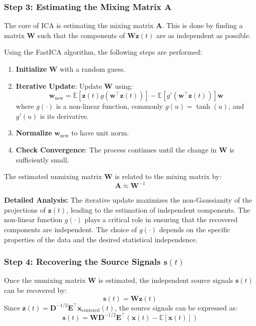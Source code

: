\documentclass{exam}
\begin{document}
\subsubsection{Step 3: Estimating the Mixing Matrix \(\mathbf{A}\)}

The core of ICA is estimating the mixing matrix \( \mathbf{A} \). This is done by finding a matrix \( \mathbf{W} \) such that the components of \( \mathbf{W} \mathbf{z}(t) \) are as independent as possible.

Using the FastICA algorithm, the following steps are performed:

\begin{enumerate}
    \item \textbf{Initialize} \( \mathbf{W} \) with a random guess.
    \item \textbf{Iterative Update}: Update \( \mathbf{W} \) using:
    \[
    \mathbf{w}_{\text{new}} = \mathbb{E}[\mathbf{z}(t) g(\mathbf{w}^\top \mathbf{z}(t))] - \mathbb{E}[g'(\mathbf{w}^\top \mathbf{z}(t))] \mathbf{w}
    \]
    where \( g(\cdot) \) is a non-linear function, commonly \( g(u) = \tanh(u) \), and \( g'(u) \) is its derivative.
    \item \textbf{Normalize} \( \mathbf{w}_{\text{new}} \) to have unit norm.
    \item \textbf{Check Convergence}: The process continues until the change in \( \mathbf{W} \) is sufficiently small.
\end{enumerate}

The estimated unmixing matrix \( \mathbf{W} \) is related to the mixing matrix by:
\[
\mathbf{A} \approx \mathbf{W}^{-1}
\]

\textbf{Detailed Analysis:} The iterative update maximizes the non-Gaussianity of the projections of \( \mathbf{z}(t) \), leading to the estimation of independent components. The non-linear function \( g(\cdot) \) plays a critical role in ensuring that the recovered components are independent. The choice of \( g(\cdot) \) depends on the specific properties of the data and the desired statistical independence.

\subsubsection{Step 4: Recovering the Source Signals \(\mathbf{s}(t)\)}

Once the unmixing matrix \( \mathbf{W} \) is estimated, the independent source signals \( \mathbf{s}(t) \) can be recovered by:
\[
\mathbf{s}(t) = \mathbf{W} \mathbf{z}(t)
\]
Since \( \mathbf{z}(t) = \mathbf{D}^{-1/2} \mathbf{E}^\top \mathbf{x}_{\text{centered}}(t) \), the source signals can be expressed as:
\[
\mathbf{s}(t) = \mathbf{W} \mathbf{D}^{-1/2} \mathbf{E}^\top \left(\mathbf{x}(t) - \mathbb{E}[\mathbf{x}(t)]\right)
\]
\end{document}

